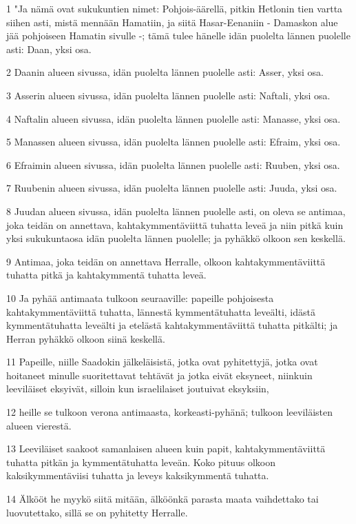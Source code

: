 \par 1 "Ja nämä ovat sukukuntien nimet: Pohjois-äärellä, pitkin Hetlonin tien vartta siihen asti, mistä mennään Hamatiin, ja siitä Hasar-Eenaniin - Damaskon alue jää pohjoiseen Hamatin sivulle -; tämä tulee hänelle idän puolelta lännen puolelle asti: Daan, yksi osa.
\par 2 Daanin alueen sivussa, idän puolelta lännen puolelle asti: Asser, yksi osa.
\par 3 Asserin alueen sivussa, idän puolelta lännen puolelle asti: Naftali, yksi osa.
\par 4 Naftalin alueen sivussa, idän puolelta lännen puolelle asti: Manasse, yksi osa.
\par 5 Manassen alueen sivussa, idän puolelta lännen puolelle asti: Efraim, yksi osa.
\par 6 Efraimin alueen sivussa, idän puolelta lännen puolelle asti: Ruuben, yksi osa.
\par 7 Ruubenin alueen sivussa, idän puolelta lännen puolelle asti: Juuda, yksi osa.
\par 8 Juudan alueen sivussa, idän puolelta lännen puolelle asti, on oleva se antimaa, joka teidän on annettava, kahtakymmentäviittä tuhatta leveä ja niin pitkä kuin yksi sukukuntaosa idän puolelta lännen puolelle; ja pyhäkkö olkoon sen keskellä.
\par 9 Antimaa, joka teidän on annettava Herralle, olkoon kahtakymmentäviittä tuhatta pitkä ja kahtakymmentä tuhatta leveä.
\par 10 Ja pyhää antimaata tulkoon seuraaville: papeille pohjoisesta kahtakymmentäviittä tuhatta, lännestä kymmentätuhatta leveälti, idästä kymmentätuhatta leveälti ja etelästä kahtakymmentäviittä tuhatta pitkälti; ja Herran pyhäkkö olkoon siinä keskellä.
\par 11 Papeille, niille Saadokin jälkeläisistä, jotka ovat pyhitettyjä, jotka ovat hoitaneet minulle suoritettavat tehtävät ja jotka eivät eksyneet, niinkuin leeviläiset eksyivät, silloin kun israelilaiset joutuivat eksyksiin,
\par 12 heille se tulkoon verona antimaasta, korkeasti-pyhänä; tulkoon leeviläisten alueen vierestä.
\par 13 Leeviläiset saakoot samanlaisen alueen kuin papit, kahtakymmentäviittä tuhatta pitkän ja kymmentätuhatta leveän. Koko pituus olkoon kaksikymmentäviisi tuhatta ja leveys kaksikymmentä tuhatta.
\par 14 Älkööt he myykö siitä mitään, älköönkä parasta maata vaihdettako tai luovutettako, sillä se on pyhitetty Herralle.
